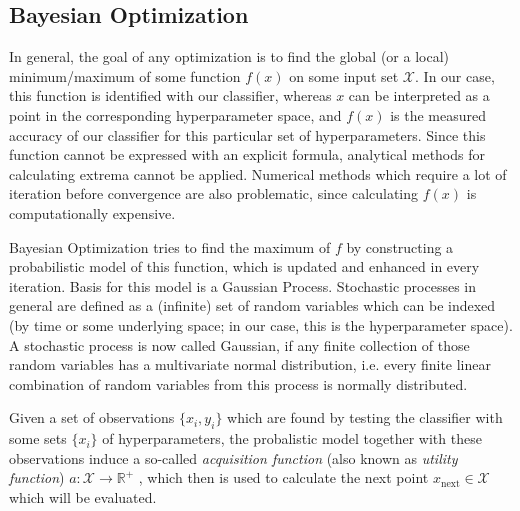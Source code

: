 \subsection{Bayesian Optimization}\label{subsec:bayes_opt}
In general, the goal of any optimization is to find the global (or a local) minimum/maximum of some function $f(x)$ on some input set $\mathcal{X}$. In our case, this function is identified with our classifier, whereas $x$ can be interpreted as a point in the corresponding hyperparameter space, and $f(x)$ is the measured accuracy of our classifier for this particular set of hyperparameters. Since this function cannot be expressed with an explicit formula, analytical methods for calculating extrema cannot be applied. Numerical methods which require a lot of iteration before convergence are also problematic, since calculating $f(x)$ is computationally expensive. \par
Bayesian Optimization tries to find the maximum of $f$ by constructing a probabilistic model of this function, which is updated and enhanced in every iteration. Basis for this model is a Gaussian Process. Stochastic processes in general are defined as a (infinite) set of random variables which can be indexed (by time or some underlying space; in our case, this is the hyperparameter space). A stochastic process is now called Gaussian, if any finite collection of those random variables has a multivariate normal distribution, i.e. every finite linear combination of random variables from this process is normally distributed. \par
Given a set of observations $\{x_i,y_i\}$ which are found by testing the classifier with some sets $\{x_i\}$ of hyperparameters, the probalistic model together with these observations induce a so-called \emph{acquisition function} (also known as \emph{utility function}) $a: \mathcal{X} \rightarrow \mathbb{R}^+$ , which then is used to calculate the next point $x_{\text{next}} \in \mathcal{X}$ which will be evaluated. \cite{snoek2012practical}

